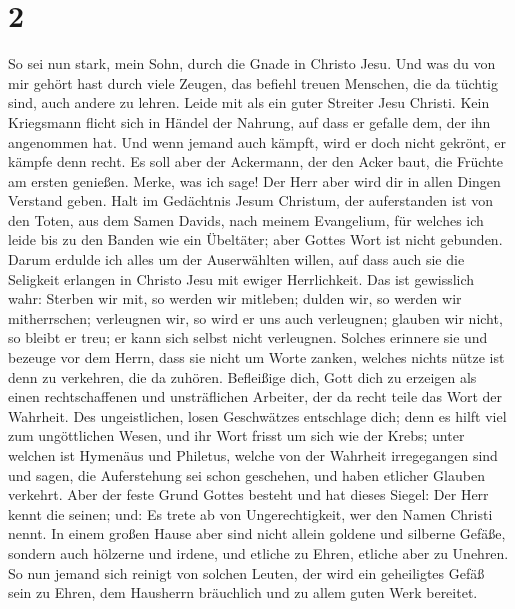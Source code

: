 \hypertarget{section-1}{%
\section{2}\label{section-1}}

 So sei nun stark, mein Sohn, durch die Gnade in Christo
Jesu.  Und was du von mir gehört hast durch viele Zeugen,
das befiehl treuen Menschen, die da tüchtig sind, auch andere zu lehren.
 Leide mit als ein guter Streiter Jesu Christi.
 Kein Kriegsmann flicht sich in Händel der Nahrung, auf
dass er gefalle dem, der ihn angenommen hat.  Und wenn
jemand auch kämpft, wird er doch nicht gekrönt, er kämpfe denn recht.
 Es soll aber der Ackermann, der den Acker baut, die
Früchte am ersten genießen. Merke, was ich sage!  Der Herr
aber wird dir in allen Dingen Verstand geben.  Halt im
Gedächtnis Jesum Christum, der auferstanden ist von den Toten, aus dem
Samen Davids, nach meinem Evangelium,  für welches ich
leide bis zu den Banden wie ein Übeltäter; aber Gottes Wort ist nicht
gebunden.  Darum erdulde ich alles um der Auserwählten
willen, auf dass auch sie die Seligkeit erlangen in Christo Jesu mit
ewiger Herrlichkeit.  Das ist gewisslich wahr: Sterben
wir mit, so werden wir mitleben;  dulden wir, so werden
wir mitherrschen; verleugnen wir, so wird er uns auch verleugnen;
 glauben wir nicht, so bleibt er treu; er kann sich
selbst nicht verleugnen.  Solches erinnere sie und
bezeuge vor dem Herrn, dass sie nicht um Worte zanken, welches nichts
nütze ist denn zu verkehren, die da zuhören.  Befleißige
dich, Gott dich zu erzeigen als einen rechtschaffenen und unsträflichen
Arbeiter, der da recht teile das Wort der Wahrheit.  Des
ungeistlichen, losen Geschwätzes entschlage dich; denn es hilft viel zum
ungöttlichen Wesen,  und ihr Wort frisst um sich wie der
Krebs; unter welchen ist Hymenäus und Philetus,  welche
von der Wahrheit irregegangen sind und sagen, die Auferstehung sei schon
geschehen, und haben etlicher Glauben verkehrt.  Aber der
feste Grund Gottes besteht und hat dieses Siegel: Der Herr kennt die
seinen; und: Es trete ab von Ungerechtigkeit, wer den Namen Christi
nennt.  In einem großen Hause aber sind nicht allein
goldene und silberne Gefäße, sondern auch hölzerne und irdene, und
etliche zu Ehren, etliche aber zu Unehren.  So nun jemand
sich reinigt von solchen Leuten, der wird ein geheiligtes Gefäß sein zu
Ehren, dem Hausherrn bräuchlich und zu allem guten Werk bereitet.

